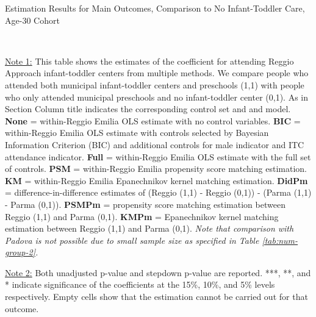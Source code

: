 \begin{table}[H] \caption{Estimation Results for Main Outcomes, Comparison to No Infant-Toddler Care, Age-30 Cohort} \label{ols-M-adult30-reg-nopres-asilo}
\scalebox{0.60}{}
\vspace{1ex} \\
\footnotesize\raggedright{\underline{Note 1:} This table shows the estimates of the coefficient for attending Reggio Approach infant-toddler centers from multiple methods. We compare people who attended both municipal infant-toddler centers and preschools (1,1) with people who only attended municipal preschools and no infant-toddler center (0,1). As in Section Column title indicates the corresponding control set and and model.  \textbf{None} = within-Reggio Emilia OLS estimate with no control variables. \textbf{BIC} = within-Reggio Emilia OLS estimate with controls selected by Bayesian Information Criterion (BIC) and additional controls for male indicator and ITC attendance indicator. \textbf{Full} = within-Reggio Emilia OLS estimate with the full set of controls. \textbf{PSM} =  within-Reggio Emilia propensity score matching estimation. \textbf{KM} =  within-Reggio Emilia Epanechnikov kernel matching estimation. \textbf{DidPm} = difference-in-difference estimates of (Reggio (1,1) - Reggio (0,1)) - (Parma (1,1) - Parma (0,1)). \textbf{PSMPm} =  propensity score matching estimation between Reggio (1,1) and Parma (0,1). \textbf{KMPm} =  Epanechnikov kernel matching estimation between Reggio (1,1) and Parma (0,1). \textit{Note that comparison with Padova is not possible due to small sample size as specified in Table \ref{tab:num-group-2}.}}

\footnotesize\raggedright{\underline{Note 2:} Both unadjusted p-value and stepdown p-value are reported. ***, **, and * indicate significance of the coefficients at the 15\%, 10\%, and 5\% levels respectively. Empty cells show that the estimation cannot be carried out for that outcome.}
\end{table}

